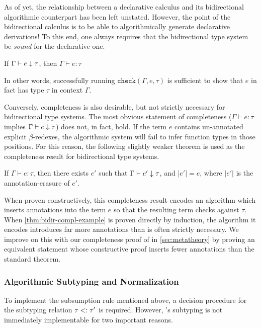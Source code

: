 As of yet, the relationship between a declarative calculus and its bidirectional algorithmic counterpart has been left unstated. However, the point of the bidirectional calculus is to be able to algorithmically generate declarative derivations! To this end, one always requires that the bidirectional type system be \textit{sound} for the declarative one.
\begin{theorem}
If $\Gamma \vdash e \downarrow \tau$, then $\Gamma \vdash e : \tau$
\end{theorem}
In other words, successfully running $\texttt{check}(\Gamma,e,\tau)$ is sufficient to show that $e$ in fact has type $\tau$ in context $\Gamma$.

Conversely, completeness is also desirable, but not strictly necessary for bidirectional type systems.  The most obvious statement of completeness ($\Gamma \vdash e : \tau$ implies $\Gamma \vdash e \downarrow \tau$) does not, in fact, hold. If the term $e$ contains un-annotated explicit $\beta$-redexes, the algorithmic system will fail to infer function types in those positions. For this reason, the following slightly weaker theorem is used as the completeness result for bidirectional type systems.
\begin{theorem}
\label{thm:bidir-compl-example}
If $\Gamma \vdash e : \tau$, then there exists $e'$ such that $\Gamma \vdash e' \downarrow \tau$, and $|e'| = e$, where $|e'|$ is the annotation-erasure of $e'$.
\end{theorem}

When proven constructively, this completeness result encodes an algorithm which inserts annotations into the term $e$ so that the resulting term checks against $\tau$. When \autoref{thm:bidir-compl-example} is proven directly by induction, the algorithm it encodes introduces far more annotations than is often strictly necessary. We improve on this with our completeness proof of \bilambdaamor in \autoref{sec:metatheory} by proving an equivalent statement whose constructive proof inserts fewer annotations than the standard theorem.

\subsubsection{Algorithmic Subtyping and Normalization}
To implement the subsumption rule mentioned above, a decision procedure for the subtyping relation $\tau <: \tau'$ is required. However, \dlambdaamor's subtyping is not immediately implementable for two important reasons.

